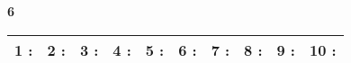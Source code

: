 \documentclass[a4paper, 11pt]{article}
\begin{document}
{\Large\bf 6 } \hspace{1.5cm}
\begin{tabular}{| l|l|l|l|l|l|l|l|l|l| }
\hline
{\large 1 }: \hspace*{0.5cm}
& {\large 2 }: \hspace*{0.5cm}
& {\large 3 }: \hspace*{0.5cm}
& {\large 4 }: \hspace*{0.5cm}
& {\large 5 }: \hspace*{0.5cm}
& {\large 6 }: \hspace*{0.5cm}
& {\large 7 }: \hspace*{0.5cm}
& {\large 8 }: \hspace*{0.5cm}
& {\large 9 }: \hspace*{0.5cm}
& {\large 10 }: \hspace*{0.5cm}
\\ 
 \hline
\end{tabular}
\vspace*{1cm} 
\end{document}
